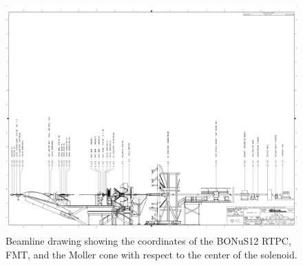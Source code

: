 \documentclass[12pt]{article}
\begin{document}
\begin{figure}[h!]
  \begin{center}
    \includegraphics[page=2, width=1.0\textwidth,clip,
     trim=0mm 0mm 0mm 0mm]{figures/BF2001-02-00-0000_-_PDF.pdf}
     \caption{Beamline drawing showing the coordinates of the BONuS12 RTPC, 
     FMT, and the Moller cone with respect to the center of the solenoid.}
    \label{fig:bonus12-zoom}
  \end{center}
\end{figure}
\end{document}
